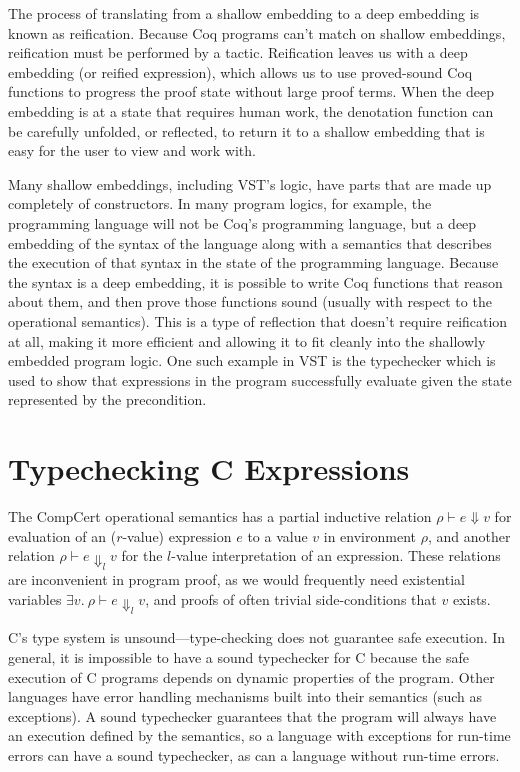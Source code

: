 \documentclass{puthesis}
\begin{document}
The process of translating from a shallow embedding to a deep
embedding is known as reification. Because Coq programs can't match on
shallow embeddings, reification must be performed by a
tactic. Reification leaves us with a deep embedding (or reified
expression), which allows us to use proved-sound Coq functions to
progress the proof state without large proof terms. When the deep
embedding is at a state that requires human work, the denotation
function can be carefully unfolded, or reflected, to return it to a
shallow embedding that is easy for the user to view and work with.


Many shallow embeddings, including VST's logic, have parts that are
made up completely of constructors. In many program logics, for
example, the programming language will not be Coq's programming
language, but a deep embedding of the syntax of the language along
with a semantics that describes the execution of that syntax in the
state of the programming language. Because the syntax is a deep
embedding, it is possible to write Coq functions that reason about
them, and then prove those functions sound (usually with respect to
the operational semantics). This is a type of reflection that doesn't
require reification at all, making it more efficient and allowing it
to fit cleanly into the shallowly embedded program logic. One such
example in VST is the typechecker which is used to show that
expressions in the program successfully evaluate given the state
represented by the precondition.


\section{Typechecking C Expressions}

The CompCert operational semantics has a partial inductive relation
$\rho \vdash e\Downarrow v$ for evaluation of an ($r$-value)
expression $e$ to a value $v$ in environment $\rho$, and another
relation $\rho \vdash e\Downarrow_l v$ for the $l$-value
interpretation of an expression.  These relations are inconvenient in
program proof, as we would frequently need existential variables
$\exists v.~\rho \vdash e\Downarrow_l v$, and proofs of often trivial
side-conditions that $v$ exists. 

C's type system is unsound---type-checking does not guarantee safe
execution. In general, it is impossible to have a sound typechecker
for C because the safe execution of C programs depends on dynamic
properties of the program. Other languages have error handling
mechanisms built into their semantics (such as exceptions). A sound
typechecker guarantees that the program will always have an execution
defined by the semantics, so a language with exceptions for run-time
errors can have a sound typechecker, as can a language without
run-time errors. 
\end{document}
